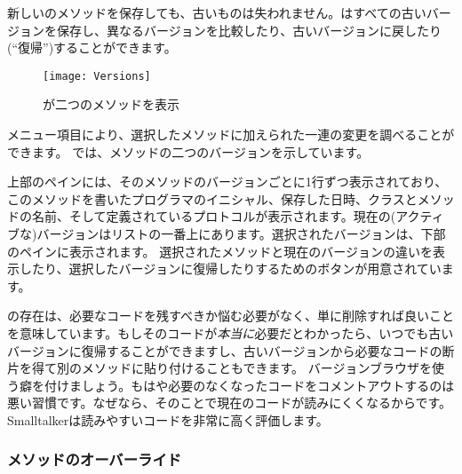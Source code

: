 \documentclass[a4paper,10pt,twoside]{book}
\begin{document}
新しいのメソッドを保存しても、古いものは失われません。\pharo はすべての古いバージョンを保存し、異なるバージョンを比較したり、古いバージョンに戻したり(``復帰'')することができます。
\begin{figure}[btp]
   \centering
   \texttt{[image: Versions]}
   \caption{が二つのメソッドを表示}
\end{figure}
メニュー項目により、選択したメソッドに加えられた一連の変更を調べることができます。
では、メソッドの二つのバージョンを示しています。

上部のペインには、そのメソッドのバージョンごとに1行ずつ表示されており、このメソッドを書いたプログラマのイニシャル、保存した日時、クラスとメソッドの名前、そして定義されているプロトコルが表示されます。現在の(アクティブな)バージョンはリストの一番上にあります。選択されたバージョンは、下部のペインに表示されます。
選択されたメソッドと現在のバージョンの違いを表示したり、選択したバージョンに復帰したりするためのボタンが用意されています。

の存在は、必要なコードを残すべきか悩む必要がなく、単に削除すれば良いことを意味しています。もしそのコードが\emph{本当に}必要だとわかったら、いつでも古いバージョンに復帰することができますし、古いバージョンから必要なコードの断片を得て別のメソッドに貼り付けることもできます。
バージョンブラウザを使う癖を付けましょう。もはや必要のなくなったコードをコメントアウトするのは悪い習慣です。なぜなら、そのことで現在のコードが読みにくくなるからです。
Smalltalkerは読みやすいコードを非常に高く評価します。


\subsubsection{メソッドのオーバーライド}
\end{document}
